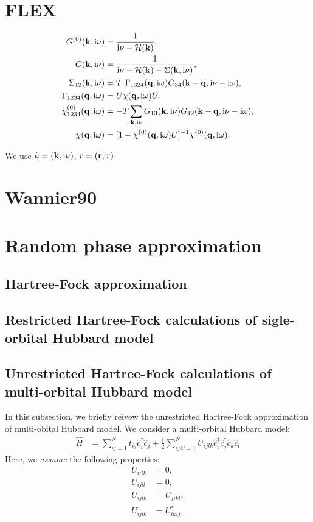 \documentclass[submission, LectureNotes]{SciPost}
\newcommand{\bk}{\ensuremath{{\bf k}}}
\newcommand{\br}{\ensuremath{{\bf r}}}
\newcommand{\bq}{\ensuremath{{\bf q}}}
\newcommand\ii{\mathrm{i}}%
\newcommand\iv{\ii\nu}%
\newcommand\iw{\ii\omega}%
\begin{document}
\clearpage
\section{FLEX}

\begin{align}
    G^{(0)}(\bk, \iv) &= \frac{1}{\iv - \mathcal{H}(\bk)},\\
    G(\bk, \iv) &= \frac{1}{\iv - \mathcal{H}(\bk) - \Sigma(\bk, \iv)},\\
    \Sigma_{12}(\bk, \iv) &= T~\Gamma_{1324}(\bq, \iw) G_{34}(\bk-\bq, \iv-\iw),\\
    \Gamma_{1234}(\bq, \iw) &= U \chi(\bq, \iw) U,\\
    \chi^{(0)}_{1234}(\bq,\iw) &= - T\sum_{\bk,\iv} G_{13}(\bk,\iv) G_{42}(\bk-\bq, \iv-\iw),\\
    \chi(\bq,\iw) &= [1 - \chi^{(0)}(\bq,\iw) U]^{-1} \chi^{(0)}(\bq, \iw).
\end{align}

We use $k=(\bk, \iv)$, $r=(\br, \tau)$

\clearpage
\section{Wannier90}


\clearpage
\section{Random phase approximation}
\subsection{Hartree-Fock approximation}
\clearpage
\subsection{Restricted Hartree-Fock calculations of sigle-orbital Hubbard model}

\clearpage
\subsection{Unrestricted Hartree-Fock calculations of multi-orbital Hubbard model}
In this subsection, we briefly reivew the unrestricted Hartree-Fock approximation of multi-obital Hubbard model.
We consider a multi-orbital Hubbard model:
\begin{align}
    \hat{H} &= \sum_{ij=1}^N t_{ij} \hat{c}^\dagger_i \hat{c}_j + \frac{1}{2} \sum_{ijkl=1}^N U_{ijlk}\hat{c}^\dagger_i \hat{c}^\dagger_j \hat{c}_k \hat{c}_l
\end{align}
Here, we \textit{assume} the following properties:
\begin{align}
U_{iilk} &= 0,\label{eq:U-prop-start}\\
U_{ijll} &= 0,\\
U_{ijlk} &= U_{jikl}, \\
U_{ijlk} &= U_{lkij}^*.\label{eq:U-prop-end}
\end{align}
\end{document}
